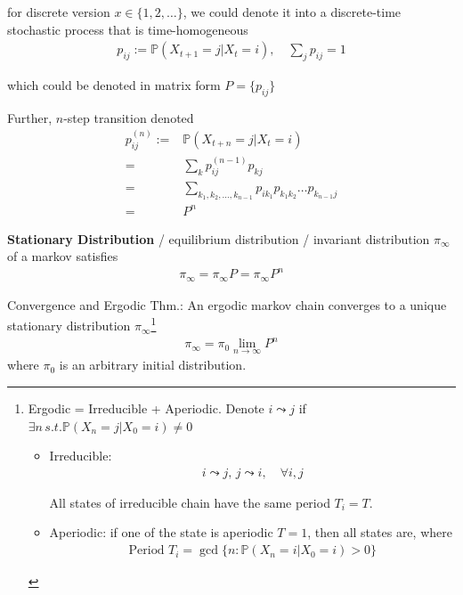     for discrete version $ x\in\{1,2,\ldots\} $, we could denote it into a discrete-time stochastic process that is time-homogeneous
    \begin{align}
        p_{ij}:= \mathbb{P}\left( X_{t+1}=j|X_{t}=i \right)  ,\quad \sum_{j}p_{ij}=1
    \end{align}

    which could be denoted in matrix form $ P=\{p_{ij}\} $
    
    Further, $ n $-step transition denoted
    \begin{align}
        p^{(n)}_{ij}:=&\mathbb{P}\left( X_{t+n}=j|X_t=i \right) \\
        =&\sum_{k}p^{(n-1)}_{ij}p_{kj}\\
        =&\sum_{k_1,k_2,\ldots ,k_{n-1}}p_{ik_1}p_{k_1k_2}\ldots p_{k_{n-1}j}\\
        =&P^n
    \end{align}

    \textbf{Stationary Distribution} / equilibrium distribution / invariant distribution $ \pi_\infty $ of a markov satisfies
    \begin{align}
         \pi_\infty=\pi_\infty P=\pi_{\infty}P^n
    \end{align}
    
    Convergence and Ergodic Thm.: An ergodic markov chain converges to a unique stationary distribution $ \pi_\infty $\footnote{Ergodic = Irreducible + Aperiodic. Denote $ i\leadsto j $ if $ \exists n\,s.t.  \mathbb{P}\left( X_n=j|X_0=i \right) \neq 0 $
    \begin{itemize}[topsep=2pt,itemsep=0pt]
        \item Irreducible:
        \begin{align}
            i\leadsto j,\, j\leadsto i,\quad \forall i,j 
        \end{align}

        All states of irreducible chain have the same period $ T_i=T $. 

        \item Aperiodic: if one of the state is aperiodic $ T=1 $, then all states are, where
        \begin{align}
            \text{Period }T_i=\gcd \{n: \mathbb{P}\left( X_n=i|X_0=i \right)>0 \} 
        \end{align}
    \end{itemize}
    
        }
    \begin{align}
        \pi_{\infty}=\pi_0 \lim_{n\to\infty}P^n
    \end{align}
    where $ \pi_0 $ is an arbitrary initial distribution.
    
